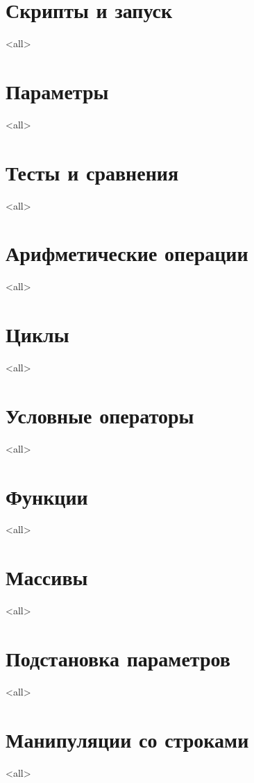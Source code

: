 \section{Скрипты и запуск}
\mode<all>{}
\section{Параметры}
\mode<all>{}
\section{Тесты и сравнения}
\mode<all>{}
\section{Арифметические операции}
\mode<all>{}
\section{Циклы}
\mode<all>{}
\section{Условные операторы}
\mode<all>{}
\section{Функции}
\mode<all>{}
\section{Массивы}
\mode<all>{}
\section{Подстановка параметров}
\mode<all>{}
\section{Манипуляции со строками}
\mode<all>{}
